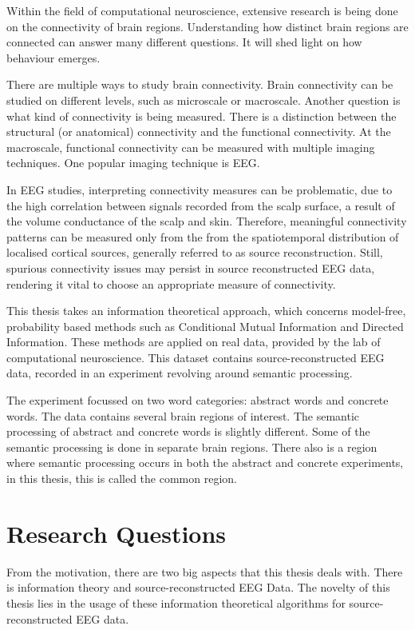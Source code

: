 Within the field of computational neuroscience, extensive research is being done on the connectivity of brain regions. Understanding how distinct brain regions are connected can answer many different questions. It will shed light on how behaviour emerges. 

There are multiple ways to study brain connectivity. Brain connectivity can be studied on different levels, such as microscale or macroscale. Another question is what kind of connectivity is being measured. There is a distinction between the structural (or anatomical) connectivity and the functional connectivity. At the macroscale, functional connectivity can be measured with multiple imaging techniques. One popular imaging technique is EEG.

In EEG studies, interpreting connectivity measures can be problematic, due to the high correlation between signals recorded from the scalp surface, a result of the volume conductance of the scalp and skin. Therefore, meaningful connectivity patterns can be measured only from the from the spatiotemporal distribution of localised cortical sources, generally referred to as source reconstruction. Still, spurious connectivity issues may persist in source reconstructed EEG data, rendering it vital to choose an appropriate measure of connectivity.

This thesis takes an information theoretical approach, which concerns model-free, probability based methods such as Conditional Mutual Information and Directed Information. These methods are applied on real data, provided by the lab of computational neuroscience. This dataset contains source-reconstructed EEG data, recorded in an experiment revolving around semantic processing. 

The experiment focussed on two word categories: abstract words and concrete words. The data contains several brain regions of interest. The semantic processing of abstract and concrete words is slightly different. Some of the semantic processing is done in separate brain regions. There also is a region where semantic processing occurs in both the abstract and concrete experiments, in this thesis, this is called the common region.

\section{Research Questions}

From the motivation, there are two big aspects that this thesis deals with. There is information theory and source-reconstructed EEG Data. The novelty of this thesis lies in the usage of these information theoretical algorithms for source-reconstructed EEG data.

